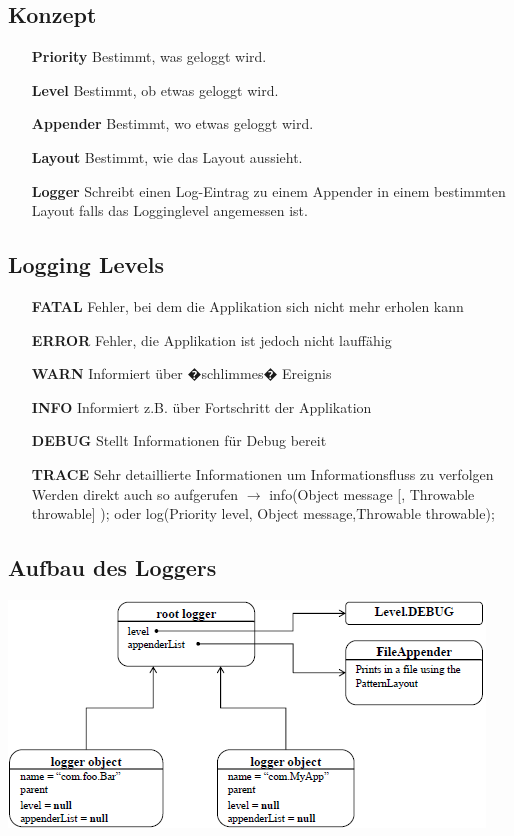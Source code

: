 \documentclass[a4paper,10pt]{article}
\newcommand{\Bold}[1]{\textbf{#1}} %
\begin{document}
\subsection{Konzept}
\begin{itemize}
	\item[\Bold {Priority}] Bestimmt, was geloggt wird.
	\item[\Bold {Level}] Bestimmt, ob etwas geloggt wird.
	\item[\Bold {Appender}] Bestimmt, wo etwas geloggt wird.
	\item[\Bold {Layout}] Bestimmt, wie das Layout aussieht.
	\item[\Bold {Logger}] Schreibt einen Log-Eintrag zu einem Appender in einem bestimmten Layout falls das Logginglevel angemessen ist.
\end{itemize}

\subsection{Logging Levels}
\begin{itemize}
	\item[\Bold {FATAL}] Fehler, bei dem die Applikation sich nicht mehr erholen kann
	\item[\Bold {ERROR}] Fehler, die Applikation ist jedoch nicht lauff\"{a}hig
	\item[\Bold {WARN}] Informiert \"{u}ber �schlimmes� Ereignis
	\item[\Bold {INFO}] Informiert z.B. \"{u}ber Fortschritt der Applikation
	\item[\Bold {DEBUG}] Stellt Informationen f\"{u}r Debug bereit 
	\item[\Bold {TRACE}] Sehr detaillierte Informationen um Informationsfluss zu verfolgen
Werden direkt auch so aufgerufen $\to$ info(Object message [, Throwable throwable] ); oder log(Priority level, Object message,Throwable throwable);
\end{itemize}

\subsection{Aufbau des Loggers}
\includegraphics[scale=1]{log4j.png}
\end{document}
